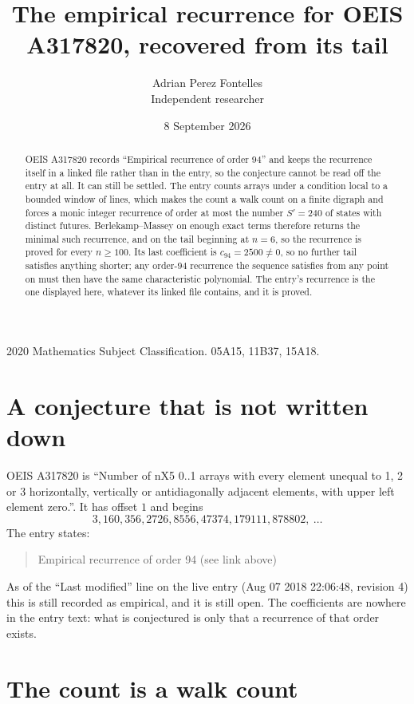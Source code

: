 \documentclass[11pt,a4paper]{article}
\title{The empirical recurrence for OEIS A317820, recovered from its tail}
\author{Adrian Perez Fontelles\\ \small Independent researcher}
\date{8 September 2026}
\theoremstyle{plain}
\theoremstyle{definition}
\begin{document}
\maketitle

\begin{abstract}
OEIS A317820 records ``Empirical recurrence of order $94$'' and keeps the recurrence itself in
a linked file rather than in the entry, so the conjecture cannot be read off the entry at all.
It can still be settled. The entry counts arrays under a condition local to a bounded window of
lines, which makes the count a walk count on a finite digraph and forces a monic integer
recurrence of order at most the number $S'=240$ of states with distinct futures. Berlekamp--Massey on
enough exact terms therefore returns the minimal such recurrence, and on the tail beginning at $n=6$, so the recurrence is proved for every $n\ge100$.
Its last coefficient is $c_{94}=2500\neq0$, so no further tail satisfies anything
shorter; any order-$94$ recurrence the sequence satisfies from any point on must then have
the same characteristic polynomial. The entry's recurrence is the one displayed here, whatever
its linked file contains, and it is proved.
\end{abstract}

\noindent\small 2020 Mathematics Subject Classification. 05A15, 11B37, 15A18.\normalsize

\section{A conjecture that is not written down}

OEIS A317820 is ``Number of nX5 0..1 arrays with every element unequal to 1, 2 or 3 horizontally, vertically or antidiagonally adjacent elements, with upper left element zero.''. It has offset $1$ and begins
\[
3, 160, 356, 2726, 8556, 47374, 179111, 878802,\ \dots
\]
The entry states:
\begin{quote}
Empirical recurrence of order 94 (see link above)
\end{quote}
As of the ``Last modified'' line on the live entry (Aug 07 2018 22:06:48, revision 4)
this is still recorded as empirical, and it is still open. The coefficients are nowhere in the
entry text: what is conjectured is only that a recurrence of that order exists.

\section{The count is a walk count}
\end{document}
